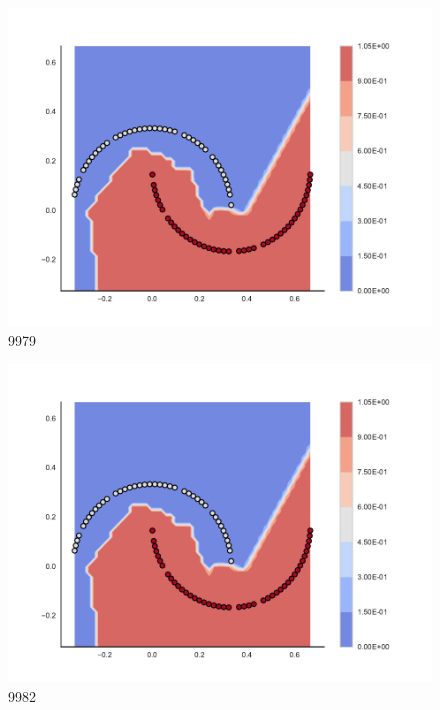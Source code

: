 \begin{subfigure}[b]{0.09\textwidth}
    \includegraphics[clip, trim=2.35cm 1.75cm 4.5cm 0cm,width=\textwidth]{img/convergence/9979.pdf}
    \caption{9979}
    \label{fig:convergence_9979}
\end{subfigure}
%
\begin{subfigure}[b]{0.09\textwidth}
    \includegraphics[clip, trim=2.35cm 1.75cm 4.5cm 0cm,width=\textwidth]{img/convergence/9982.pdf}
    \caption{9982}
    \label{fig:convergence_9982}
\end{subfigure}
%
